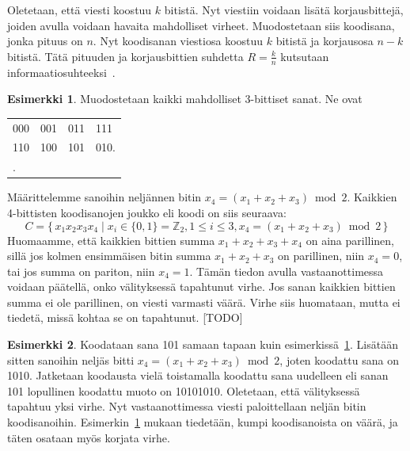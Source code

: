 \documentclass[a4paper,12pt,leqno,oneside]{report} %
\theoremstyle{plain}
\theoremstyle{plain}
\theoremstyle{definition}
\newtheorem{esimerkki}{Esimerkki}[chapter]
\theoremstyle{remark}
\numberwithin{equation}{chapter}
\newcommand*{\Zset}{\mathbb{Z}}  %
\begin{document}
    Oletetaan, että viesti koostuu $k$ bitistä. Nyt viestiin voidaan lisätä korjausbittejä, joiden avulla voidaan havaita mahdolliset virheet. Muodostetaan siis koodisana, jonka pituus on $n$. Nyt koodisanan viestiosa koostuu $k$ bitistä ja korjausosa $n-k$ bitistä. Tätä pituuden ja korjausbittien suhdetta $R = \frac{k}{n}$ kutsutaan informaatiosuhteeksi~\cite[s.~267]{GW}.
    \begin{esimerkki}\label{esim:3bitsanat}
        Muodostetaan kaikki mahdolliset 3-bittiset sanat. Ne ovat
        \begin{center}
            \begin{tabular}[t]{llll}
                000 & 001 & 011 & 111 \\
                110 & 100 & 101 & 010. \\.
            \end{tabular}
        \end{center}
        Määrittelemme sanoihin neljännen bitin
        $x_4 = (x_1 + x_2 + x_3) \bmod2$. Kaikkien 4-bittisten koodisanojen joukko eli koodi on siis seuraava:
        \[
            C = \{\, x_1x_2x_3x_4 \mid  x_i \in \{0,1\} = \Zset_2, 1 \le i \le 3, x_4 = (x_1 + x_2 + x_3) \bmod2\,\}
        \]
        Huomaamme, että kaikkien bittien summa $x_1 + x_2 + x_3 + x_4$ on aina parillinen, sillä jos kolmen ensimmäisen bitin summa $x_1 + x_2 + x_3$ on parillinen, niin $x_4 = 0$, tai jos summa on pariton, niin $x_4 = 1$.
        Tämän tiedon avulla vastaanottimessa voidaan päätellä, onko välityksessä tapahtunut virhe. Jos sanan kaikkien bittien summa ei ole parillinen, on viesti varmasti väärä. Virhe siis huomataan, mutta ei tiedetä, missä kohtaa se on tapahtunut. [TODO]
    \end{esimerkki}
    \begin{esimerkki}\label{esim:3bitsanatjatko}
        Koodataan sana 101 samaan tapaan kuin
        esimerkissä~\ref{esim:3bitsanat}. Lisätään sitten sanoihin neljäs bitti $x_4 = (x_1 + x_2 + x_3) \bmod2$, joten koodattu sana on 1010. Jatketaan koodausta vielä toistamalla koodattu sana uudelleen eli sanan 101 lopullinen koodattu muoto on 10101010. Oletetaan, että välityksessä tapahtuu yksi virhe. Nyt vastaanottimessa viesti paloittellaan neljän bitin koodisanoihin. Esimerkin~\ref{esim:3bitsanat} mukaan tiedetään, kumpi koodisanoista on väärä, ja täten osataan myös korjata virhe.
    \end{esimerkki}
\end{document}
